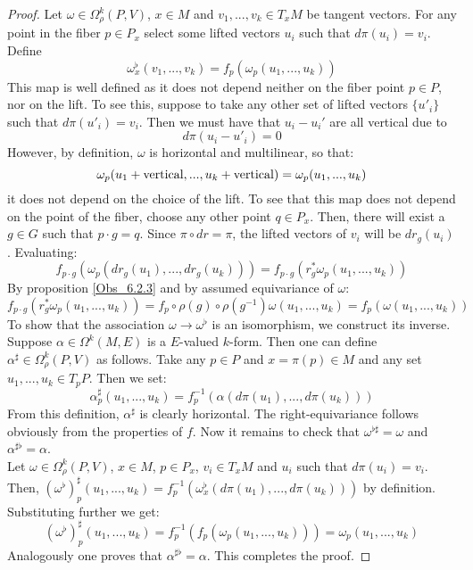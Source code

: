 \documentclass[12pt,a4paper]{report}
\theoremstyle{definition}
\theoremstyle{Theorem}
\theoremstyle{definition}
\theoremstyle{definition}
\begin{document}
	\begin{proof}
		Let $\omega\in\Omega^k_\rho(P,V)$, $x\in M$ and $v_1,...,v_k\in T_xM$ be tangent vectors. For any point in the fiber $p\in P_x$ select some lifted vectors $u_i$ such that $d\pi(u_i)=v_i$. Define $$\omega^\flat_x(v_1,...,v_k)=f_p(\omega_p(u_1,...,u_k))$$
		This map is well defined as it does not depend neither on the fiber point $p\in P$, nor on the lift. To see this, suppose to take any other set of lifted vectors $\{u'_i\}$ such that $d\pi(u'_i)=v_i$. Then we must have that $u_i-u_i'$ are  all vertical due to
		$$d\pi(u_i-u'_i)=0$$
		However, by definition, $\omega$ is horizontal and multilinear, so that:
		$$\omega_p(u_1+\hbox{vertical},...,u_k+\hbox{vertical})=\omega_p(u_1,...,u_k)$$
		it does not depend on the choice of the lift. To see that this map does not depend on the point of the fiber, choose any other point $q\in P_x$. Then, there will exist a $g\in G$ such that $p\cdot g=q$. Since $\pi\circ dr=\pi$, the lifted vectors of $v_i$ will be $dr_g(u_i)$. Evaluating:
		$$f_{p\cdot g}(\omega_p(dr_g(u_1),...,dr_g(u_k)))=
		f_{p\cdot g}(r^*_g\omega_p(u_1,...,u_k))$$
		By proposition \ref{Obs_6.2.3} and by assumed equivariance of $\omega$:
		$$f_{p\cdot g}(r^*_g\omega_p(u_1,...,u_k))=f_p\circ \rho(g)\circ \rho(g^{-1})\omega(u_1,...,u_k)=f_p(\omega(u_1,...,u_k))$$
		To show that the association $\omega\rightarrow\omega^\flat$ is an isomorphism, we construct its inverse. Suppose $\alpha\in\Omega^k(M,E)$ is a $E$-valued $k$-form. Then one can define $\alpha^\sharp\in \Omega^k_\rho(P,V)$ as follows. Take any $p\in P$ and $x=\pi(p)\in M$ and any set $u_1,...,u_k\in T_pP$. Then we set:
		$$\alpha^\sharp_p(u_1,...,u_k)=f^{-1}_p(\alpha(d\pi(u_1),...,d\pi(u_k)))$$
		From this definition, $\alpha^\sharp$ is clearly horizontal. The right-equivariance follows obviously from the properties of $f$. Now it remains to check that $\omega^{\flat\sharp}=\omega$ and $\alpha^{\sharp\flat}=\alpha$.\\
		Let $\omega\in\Omega_\rho^k(P,V)$, $x\in M$, $p\in P_x$, $v_i\in T_xM$ and $u_i$ such that $d\pi(u_i)=v_i$.
		Then, $(\omega^\flat)^\sharp_p(u_1,...,u_k)=f^{-1}_p(\omega^\flat_x(d\pi(u_1),...,d\pi(u_k)))$ by definition. Substituting further we get:
		$$(\omega^\flat)^\sharp_p(u_1,...,u_k)=
		f^{-1}_p(f_p(\omega_p(u_1,...,u_k)))=\omega_p(u_1,...,u_k)$$
		Analogously one proves that $\alpha^{\sharp\flat}=\alpha$. This completes the proof.
	\end{proof}
\end{document}

